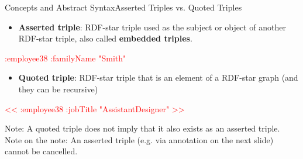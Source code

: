 \documentclass[aspectratio=169]{beamer}
\begin{document}
\begin{frame}{Concepts and Abstract Syntax}{Asserted Triples vs. Quoted Triples}
    \begin{itemize}
        \item \textbf{Asserted triple}: RDF-star triple used as the subject or object of another RDF-star triple, also called \textbf{embedded triples}.
    \end{itemize}
    \begin{minipage}{\textwidth}
    \centering
    \textcolor{red}{:employee38 :familyName   "Smith" }
    \end{minipage}
    \begin{itemize}
        \item \textbf{Quoted triple}: RDF-star triple that is an element of a RDF-star graph (and they can be recursive)
    \end{itemize}
    \begin{minipage}{\textwidth}
    \centering
    \textcolor{red}{<<  :employee38 :jobTitle   "AssistantDesigner" >>}
    \end{minipage}
    Note: A quoted triple does not imply that it also exists as an asserted triple.\\
    Note on the note: An asserted triple (e.g. via annotation on the next slide) cannot be cancelled.

\end{frame}
\end{document}
